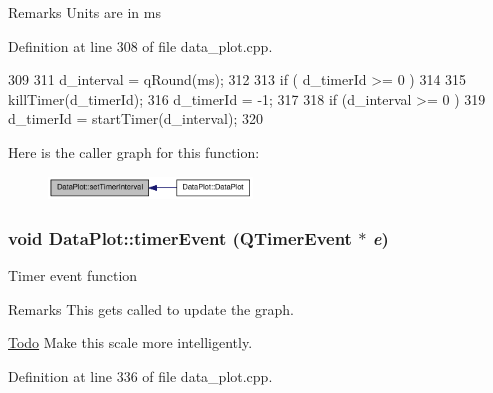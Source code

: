 \begin{DoxyRemark}{Remarks}
Units are in ms 
\end{DoxyRemark}




Definition at line 308 of file data\_\-plot.cpp.




\begin{DoxyCode}
309 {
311     d_interval = qRound(ms);
312 
313     if ( d_timerId >= 0 )
314     {
315         killTimer(d_timerId);
316         d_timerId = -1;
317     }
318     if (d_interval >= 0 )
319         d_timerId = startTimer(d_interval);
320 }
\end{DoxyCode}




Here is the caller graph for this function:\nopagebreak
\begin{figure}[H]
\begin{center}
\leavevmode
\includegraphics[width=154pt]{classDataPlot_a926020e0c49d78d3d5d282848368651e_icgraph}
\end{center}
\end{figure}


\hypertarget{classDataPlot_a41c9c4bc12d8d3e3abdf893c4fcfad7b}{
\subsubsection[{timerEvent}]{\setlength{\rightskip}{0pt plus 5cm}void DataPlot::timerEvent (QTimerEvent $\ast$ {\em e})}}
\label{classDataPlot_a41c9c4bc12d8d3e3abdf893c4fcfad7b}
Timer event function

\begin{DoxyRemark}{Remarks}
This gets called to update the graph. 
\end{DoxyRemark}


\begin{Desc}
\item[\hyperlink{todo__todo000002}{Todo}]Make this scale more intelligently. \end{Desc}




Definition at line 336 of file data\_\-plot.cpp.




